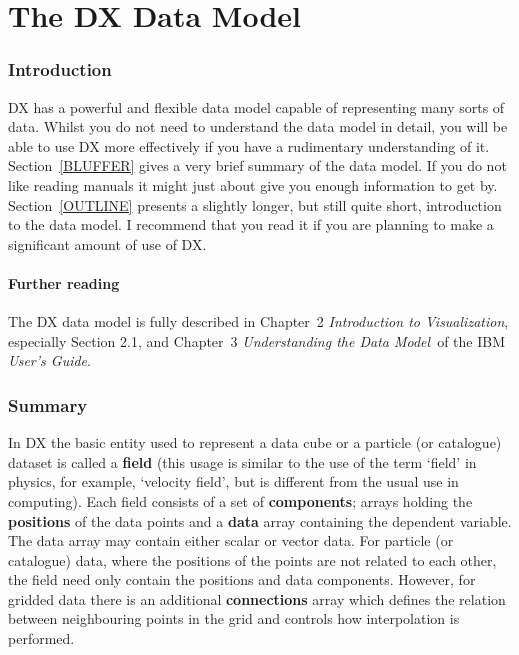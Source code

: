 \documentclass[twoside,11pt]{starlink}
\begin{document}
\part{The DX Data Model}

\section{Introduction}

DX has a powerful and flexible data model capable of representing many
sorts of data. Whilst you do not need to understand the data model in
detail, you will be able to use DX more effectively if you have a
rudimentary understanding of it. Section~\ref{BLUFFER} gives a very
brief summary of the data model. If you do not like reading manuals
it might just about give you enough information to get by.
Section~\ref{OUTLINE} presents a slightly longer, but still quite short,
introduction to the data model. I recommend that you read it if you are
planning to make a significant amount of use of DX.

\subsection{Further reading}

The DX data model is fully described in Chapter~2 \textit{Introduction
to Visualization}, especially Section 2.1, and Chapter~3 \textit{Understanding
the Data Model}\, of the IBM \textit{User's Guide}\cite{USERG}.


\section{\label{BLUFFER}Summary}


In DX the basic entity used to represent a data cube or a particle (or
catalogue) dataset is called a \textbf{field} (this usage is similar to the
use of the term `field' in physics, for example, `velocity field', but
is different from the usual use in computing). Each field consists of a
set of \textbf{components}; arrays holding the \textbf{positions} of the data
points and a \textbf{data} array containing the dependent variable. The
data array may contain either scalar or vector data. For particle (or
catalogue) data, where the positions of the points are not related to
each other, the field need only contain the positions and data
components. However, for gridded data there is an additional \textbf{connections} array which defines the relation between neighbouring
points in the grid and controls how interpolation is performed.
\end{document}
